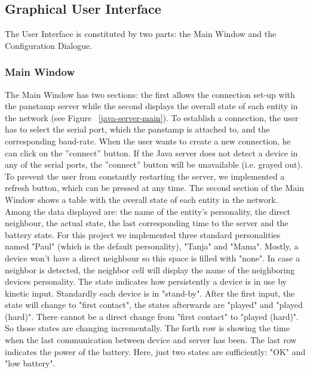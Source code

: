 \subsection{Graphical User Interface}

The User Interface is constituted by two parts: the Main Window and the Configuration Dialogue.

\subsubsection{Main Window}

The Main Window has two sections: the first allows the connection set-up with the panstamp server while the second displays the overall state of each entity in the network (see Figure ~\ref{java-server-main}). 
To establish a connection, the user has to select the serial port, which the panstamp is attached to, and the corresponding baud-rate. When the user wants to create a new connection, he can click on the ''connect'' button. 
If the Java server does not detect a device in any of the serial ports, the ''connect'' button will be unavailable (i.e. grayed out). To prevent the user from constantly restarting the server, we implemented a refresh button, which can be pressed at any time. 
The second section of the Main Window shows a table with the overall state of each entity in the network.
Among the data displayed are: the name of the entity's personality, the direct neighbour, the actual state, the last corresponding time to the server and the battery state. 
For this project we implemented three standard personalities named "Paul" (which is the default personality), "Tanja" and "Mama".
Mostly, a device won't have a direct neighbour so this space is filled with "none". In case a neighbor is detected, the neighbor cell will display the name of the neighboring devices personality. 
The state indicates how persistently a device is in use by kinetic input.
Standardly each device is in "stand-by". After the first input, the state will change to "first contact", the states afterwards are "played" and "played (hard)". There cannot be a direct change from "first contact" to "played (hard)". So those states are changing incrementally.
The forth row is showing the time when the last communication between device and server has been.
The last row indicates the power of the battery. Here, just two states are sufficiently: "OK" and "low battery".

